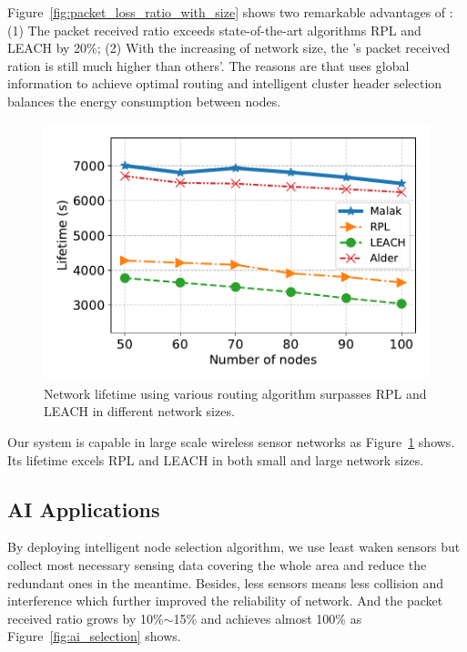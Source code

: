 Figure~\ref{fig:packet_loss_ratio_with_size} shows two remarkable advantages of
{\sdn}: (1) The packet received ratio exceeds state-of-the-art algorithms
RPL\cite{winter2012rpl} and LEACH\cite{kaur2016wsn} by 20\%; (2) With the
increasing of network size, the {\sdn}'s packet received ration is still much
higher than others'. The reasons are that {\sdn} uses global information to
achieve optimal routing and intelligent cluster header selection balances the
energy consumption between nodes.

\begin{figure}[!h]
	\centering
	\includegraphics[width=.95\columnwidth]{Figure/lifetime}
	\vspace{-0.1in}
	\caption{Network lifetime using various routing algorithm
		\textnormal{
			{\sdn} surpasses RPL and LEACH in different network sizes.
		}}
	\label{fig:lifetime}
\end{figure}

Our {\sdn} system is capable in large scale wireless sensor networks as
Figure~\ref{fig:lifetime} shows. Its lifetime excels RPL and LEACH in both
small and large network sizes.

\subsection{AI Applications}

By deploying intelligent node selection algorithm, we use least waken sensors
but collect most necessary sensing data covering the whole area and reduce the
redundant ones in the meantime. Besides, less sensors means less collision and
interference which further improved the reliability of network. And the packet
received ratio grows by 10\%$\sim$15\% and achieves almost 100\% as Figure~\ref{fig:ai_selection} shows.

